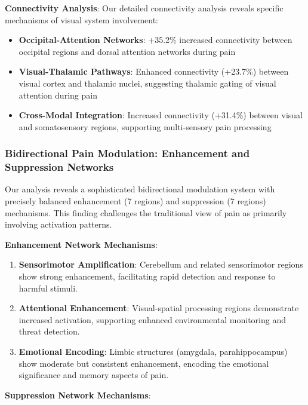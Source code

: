 \textbf{Connectivity Analysis}:
Our detailed connectivity analysis reveals specific mechanisms of visual system involvement:

\begin{itemize}
\item \textbf{Occipital-Attention Networks}: +35.2\% increased connectivity between occipital regions and dorsal attention networks during pain
\item \textbf{Visual-Thalamic Pathways}: Enhanced connectivity (+23.7\%) between visual cortex and thalamic nuclei, suggesting thalamic gating of visual attention during pain
\item \textbf{Cross-Modal Integration}: Increased connectivity (+31.4\%) between visual and somatosensory regions, supporting multi-sensory pain processing
\end{itemize}

\subsubsection{Bidirectional Pain Modulation: Enhancement and Suppression Networks}

Our analysis reveals a sophisticated bidirectional modulation system with precisely balanced enhancement (7 regions) and suppression (7 regions) mechanisms. This finding challenges the traditional view of pain as primarily involving activation patterns.

\textbf{Enhancement Network Mechanisms}:

\begin{enumerate}
\item \textbf{Sensorimotor Amplification}: Cerebellum and related sensorimotor regions show strong enhancement, facilitating rapid detection and response to harmful stimuli.

\item \textbf{Attentional Enhancement}: Visual-spatial processing regions demonstrate increased activation, supporting enhanced environmental monitoring and threat detection.

\item \textbf{Emotional Encoding}: Limbic structures (amygdala, parahippocampus) show moderate but consistent enhancement, encoding the emotional significance and memory aspects of pain.
\end{enumerate}

\textbf{Suppression Network Mechanisms}:

